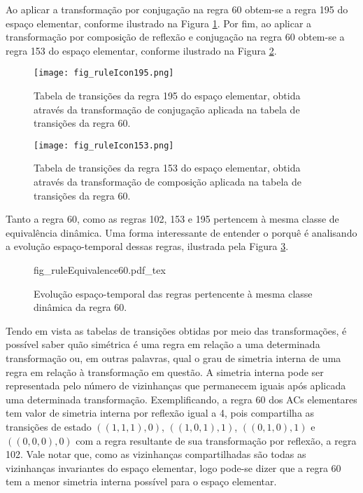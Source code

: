 Ao aplicar a transformação por conjugação na regra 60 obtem-se a regra 195 do espaço elementar, conforme ilustrado na Figura \ref{fig:table195}. Por fim, ao aplicar a transformação por composição de reflexão e conjugação na regra 60 obtem-se a regra 153 do espaço elementar, conforme ilustrado na Figura \ref{fig:table153}.

	\begin{figure}[h!]
	  \centering
	  \texttt{[image: fig\_ruleIcon195.png]}
	  \caption{Tabela de transições da regra 195 do espaço elementar, obtida através da transformação de conjugação aplicada na tabela de transições da regra 60.}
	  \label{fig:table195}
	\end{figure}

	\begin{figure}[h!]
	  \centering
	  \texttt{[image: fig\_ruleIcon153.png]}
	  \caption{Tabela de transições da regra 153 do espaço elementar, obtida através da transformação de composição aplicada na tabela de transições da regra 60.}
	  \label{fig:table153}
	\end{figure}

Tanto a regra 60, como as regras 102, 153 e 195 pertencem à mesma classe de equivalência dinâmica. Uma forma interessante de entender o porquê é analisando a evolução espaço-temporal dessas regras, ilustrada pela Figura \ref{fig:dynamicEquivalecy}.

	\begin{figure}[h!]
	  \centering
	  \def\svgscale{0.63}
	  {fig_ruleEquivalence60.pdf_tex}
	  \caption{Evolução espaço-temporal das regras pertencente à mesma classe dinâmica da regra 60.}
	  \label{fig:dynamicEquivalecy}
	\end{figure}

Tendo em vista as tabelas de transições obtidas por meio das transformações, é possível saber quão simétrica é uma regra em relação a uma determinada transformação ou, em outras palavras, qual o grau de simetria interna de uma regra em relação à transformação em questão. A simetria interna pode ser representada pelo número de vizinhanças que permanecem iguais após aplicada uma determinada transformação. Exemplificando, a regra 60 dos ACs elementares tem valor de simetria interna por reflexão igual a 4, pois compartilha as transições de estado $((1,1,1),0)$, $((1,0,1),1)$, $((0,1,0),1)$ e $ ((0,0,0),0)$ com a regra resultante de sua transformação por reflexão, a regra 102. Vale notar que, como as vizinhanças compartilhadas são todas as vizinhanças invariantes do espaço elementar, logo pode-se dizer que a regra 60 tem a menor simetria interna possível para o espaço elementar.

